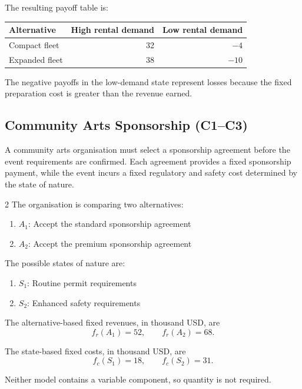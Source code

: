 The resulting payoff table is:

\begin{center}
	\begin{tabular}{lrr}
		\toprule
		Alternative & High rental demand & Low rental demand \\
		\midrule
		Compact fleet & 32 & \(-4\) \\
		Expanded fleet & 38 & \(-10\) \\
		\bottomrule
	\end{tabular}
\end{center}

The negative payoffs in the low-demand state represent losses because the
fixed preparation cost is greater than the revenue earned.


\subsection{Community Arts Sponsorship (C1--C3)}
\label{sec:problem7-community-arts-sponsorship-c1-c3}

A community arts organisation must select a sponsorship agreement before the
event requirements are confirmed. Each agreement provides a fixed sponsorship
payment, while the event incurs a fixed regulatory and safety cost determined
by the state of nature.

\begin{multicols}{2}
	The organisation is comparing two alternatives:
	\begin{enumerate}[label=\arabic*.]
		\item \(A_1\): Accept the standard sponsorship agreement
		\item \(A_2\): Accept the premium sponsorship agreement
	\end{enumerate}
	
	The possible states of nature are:
	\begin{enumerate}[label=\arabic*.]
		\item \(S_1\): Routine permit requirements
		\item \(S_2\): Enhanced safety requirements
	\end{enumerate}
	
	\columnbreak
	
	The alternative-based fixed revenues, in thousand USD, are
	\[
	f_r(A_1)=52,
	\qquad
	f_r(A_2)=68.
	\]
	
	The state-based fixed costs, in thousand USD, are
	\[
	f_c(S_1)=18,
	\qquad
	f_c(S_2)=31.
	\]
	
	Neither model contains a variable component, so quantity is not required.
\end{multicols}

